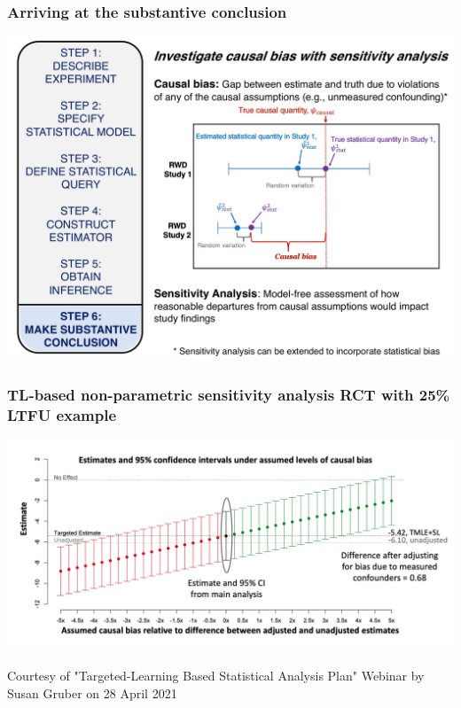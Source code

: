 \documentclass[t]{beamer}
\begin{document}

\begin{frame}
\frametitle{Arriving at the substantive conclusion}
\vspace{-16pt}
  \begin{center}
  \includegraphics[width = 1.02\textwidth]{figures/roadmap6.pdf}
  \end{center}
\end{frame}

\begin{frame}
\frametitle{TL-based non-parametric sensitivity analysis
RCT with 25\% LTFU example}
\vspace{-10pt}
  \begin{center}
  \includegraphics[width = 1.05\textwidth]{figures/gruber_sensitivity.png}
  \end{center}
  \vspace{35pt}
\tiny{Courtesy of "Targeted-Learning Based Statistical Analysis Plan" Webinar by Susan Gruber on 28 April 2021}
\end{frame}
\end{document}
